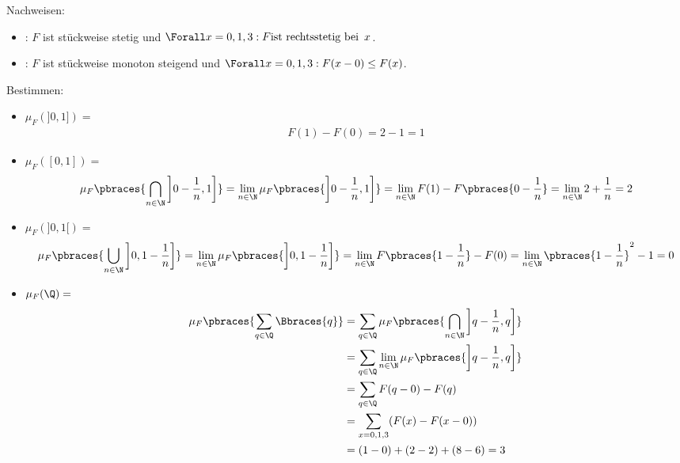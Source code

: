 \begin{solution}

Nachweisen:

\begin{itemize}

  \item {}: $F$ ist stückweise stetig und $\Forall x = 0, 1, 3: F \text{ist rechtsstetig bei} \enspace x$.

  \item {}: $F$ ist stückweise monoton steigend und $\Forall x = 0, 1, 3: F(x - 0) \leq F(x)$.

\end{itemize}

Bestimmen:

\begin{itemize}

  \item $\mu_F(]0, 1]) =$
  \begin{align*}
    F(1) - F(0) = 2 - 1 = 1
  \end{align*}

  \item $\mu_F([0, 1]) =$
  \begin{align*}
    \mu_F \pbraces{\bigcap_{n \in \N} \left ] 0 - \frac{1}{n}, 1 \right]}
    =
    \lim_{n \in \N} \mu_F \pbraces{ \left ] 0 - \frac{1}{n}, 1 \right]}
    =
    \lim_{n \in \N} F(1) - F \pbraces{0 - \frac{1}{n}}
    =
    \lim_{n \in \N} 2 + \frac{1}{n} = 2
  \end{align*}

  \item $\mu_F(]0, 1[) =$
  \begin{align*}
    \mu_F \pbraces{\bigcup_{n \in \N} \left ] 0, 1 - \frac{1}{n} \right ]}
    =
    \lim_{n \in \N} \mu_F \pbraces{\left ] 0, 1 - \frac{1}{n} \right ]}
    =
    \lim_{n \in \N} F \pbraces{1 - \frac{1}{n}} - F(0)
    =
    \lim_{n \in \N} \pbraces{1 - \frac{1}{n}}^2 - 1 = 0
  \end{align*}

  \item $\mu_F(\Q) =$
  \begin{align*}
    \mu_F \pbraces{\sum_{q \in \Q} \Bbraces{q}}
    & =
    \sum_{q \in \Q} \mu_F \pbraces
    {\bigcap_{n \in \N} \left ] q - \frac{1}{n}, q \right ]} \\
    & =
    \sum_{q \in \Q} \lim_{n \in \N} \mu_F \pbraces
    {\left ] q - \frac{1}{n}, q \right ]} \\
    & =
    \sum_{q \in \Q} F(q - 0) - F(q) \\
    & =
    \sum_{x = 0, 1, 3} (F(x) - F(x - 0)) \\
    & =
    (1 - 0) + (2 - 2) + (8 - 6) = 3
  \end{align*}

\end{itemize}

\end{solution}
